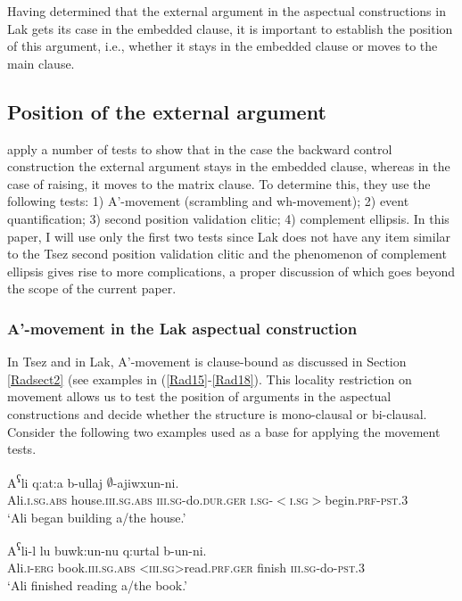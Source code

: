 \documentclass[output=paper]{langscibook}
\begin{document}
Having determined that the external argument in the aspectual constructions in Lak gets its case in the embedded clause, it is important to establish the position of this argument, i.e., whether it stays in the embedded clause or moves to the main clause.\\

\subsection{Position of the external argument}
\citet{PolinskyPotsdam2002} apply a number of tests to show that in the case the backward control construction the external argument stays in the embedded clause, whereas in the case of raising, it moves to the matrix clause. To determine this, they use the following tests: 1) A'-movement (scrambling and wh-movement); 2) event quantification; 3) second position validation clitic; 4) complement ellipsis. In this paper, I will use only the first two tests since Lak does not have any item similar to the Tsez second position validation clitic and the phenomenon of complement ellipsis gives rise to more complications, a proper discussion of which goes beyond the scope of the current paper.

\subsubsection{A'-movement in the Lak aspectual construction}\label{Radsect:3.2.1}
In Tsez and in Lak, A'-movement is clause-bound as discussed in Section \ref{Radsect2} (see examples in (\ref{Rad15}-\ref{Rad18}).  This locality restriction on movement allows us to test the position of arguments in the aspectual constructions and decide whether the structure is mono-clausal or bi-clausal. Consider the following two examples used as a base for applying the movement tests.

\ea\label{Rad29}
\gll A\textsuperscript{ʕ}li q:at:a b-ullaj $∅$-ajiwxun-ni.\\
Ali.\textsc{i.sg.abs} house.\textsc{iii.sg.abs} \textsc{iii.sg}-do.\textsc{dur.ger} \textsc{i.sg-$<$i.sg$>$}begin.\textsc{prf-pst.3}\\
\glt ‘Ali began building a/the house.’
\z 

\ea\label{Rad30}
\gll A\textsuperscript{ʕ}li-l lu buwk:un-nu q:urtal b-un-ni.\\
 Ali.\textsc{i-erg} book.\textsc{iii.sg.abs} \textsc{<iii.sg>}read.\textsc{prf.ger} finish \textsc{iii.sg}-do-\textsc{pst.3}\\
\glt ‘Ali finished reading a/the book.’
\z 
\end{document}
